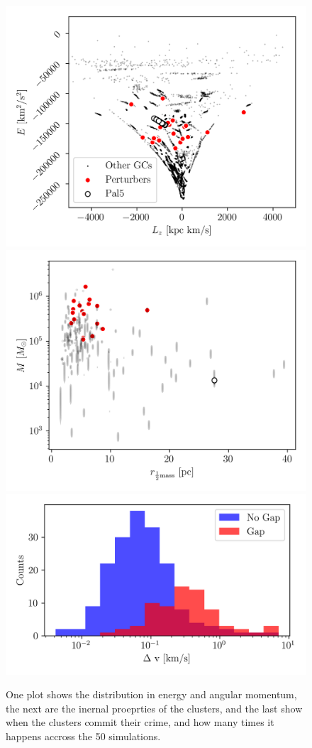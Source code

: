 \documentclass[draft]{aa}
\begin{document}
  \begin{figure}
    \centering
    \includegraphics[width=1\linewidth]{E_Lz_perturbers.png}
    \includegraphics[width=1\linewidth]{mass_size_plane.png}
    \includegraphics[width=1\linewidth]{impact_geometry_statistics_deltaP.png}
    \caption{One plot shows the distribution in energy and angular momentum, the next are the inernal proeprties of the clusters, and the last show when the clusters commit their crime, and how many times it happens accross the 50 simulations. }
    \label{fig:mass_size_plane}
    \end{figure}
\end{document}
